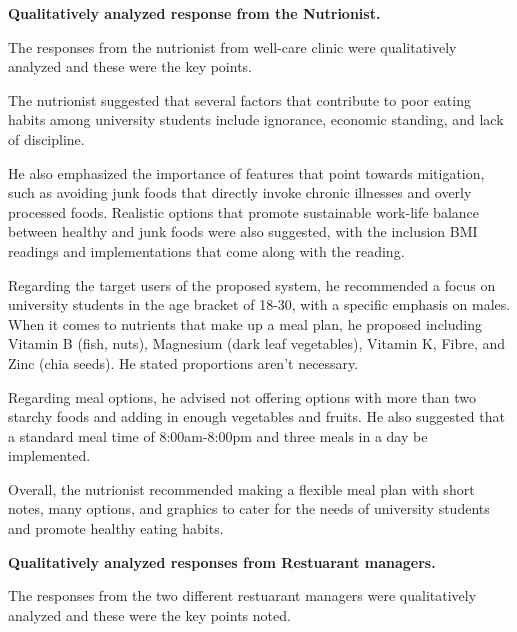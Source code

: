 \documentclass{article}
\begin{document}
\newpage
\noindent
\textbf{Qualitatively analyzed response from the Nutrionist.}

\noindent The responses from the nutrionist from well-care clinic were qualitatively analyzed and these were the key points.
\vspace{10pt}

\noindent The nutrionist suggested that several factors that contribute to poor eating habits among university students include ignorance, economic standing, and lack of discipline.

\vspace{10pt}

\noindent He also emphasized the importance of features that point towards mitigation, such as avoiding junk foods that directly invoke chronic illnesses and overly processed foods. Realistic options that promote sustainable work-life balance between healthy and junk foods were also suggested, with the inclusion  BMI readings and implementations that come along with the reading.

\vspace{10pt}

\noindent Regarding the target users of the proposed system, he recommended a focus on university students in the age bracket of 18-30, with a specific emphasis on males. When it comes to nutrients that make up a meal plan, he proposed including Vitamin B (fish, nuts), Magnesium (dark leaf vegetables), Vitamin K, Fibre, and Zinc (chia seeds). He stated proportions aren't necessary.

\vspace{10pt}

\noindent Regarding meal options, he advised not offering options with more than two starchy foods and adding in enough vegetables and fruits. He also suggested that a standard meal time of 8:00am-8:00pm and three meals in a day be implemented.

\vspace{10pt}

\noindent Overall, the nutrionist recommended making a flexible meal plan with short notes, many options, and graphics to cater for the needs of university students and promote healthy eating habits.

\vspace{40pt}

\noindent
\textbf{Qualitatively analyzed responses from Restuarant managers.}

\noindent
The responses from the two different restuarant managers were qualitatively analyzed and these were the key points noted.
\vspace{10pt}
\end{document}
